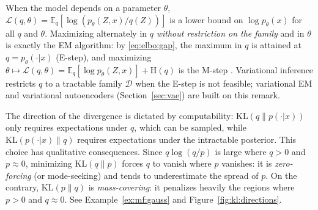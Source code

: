 \documentclass[english,graybox,envcountchap,envcountsame,sectrefs,shortlabels]{svmono}
\theoremstyle{style}
\begin{document}
\begin{remark}
When the model depends on a parameter $\theta$, $\mathcal{L}(q,\theta) = \mathbb{E}_{q}[\log (p_\theta(Z,x)/q(Z))]$ is a lower bound on $\log p_\theta(x)$ for all $q$ and $\theta$. Maximizing alternately in $q$ \emph{without restriction on the family} and in $\theta$ is exactly the EM algorithm: by \eqref{eq:elbo:gap}, the maximum in $q$ is attained at $q = p_{\theta}(\cdot|x)$ (E-step), and maximizing $\theta\mapsto\mathcal{L}(q,\theta) = \mathbb{E}_{q}[\log p_\theta(Z,x)] + \mathrm{H}(q)$ is the M-step \cite{neal1998view}. Variational inference restricts $q$ to a tractable family $\mathcal{D}$ when the E-step is not feasible; variational EM and variational autoencoders (Section~\ref{sec:vae}) are built on this remark.
\end{remark}

The direction of the divergence is dictated by computability: $\mathrm{KL}(q\|p(\cdot|x))$ only requires expectations under $q$, which can be sampled, while $\mathrm{KL}(p(\cdot|x)\|q)$ requires expectations under the intractable posterior. This choice has qualitative consequences. Since $q\log(q/p)$ is large where $q>0$ and $p\approx 0$, minimizing $\mathrm{KL}(q\|p)$ forces $q$ to vanish where $p$ vanishes: it is \emph{zero-forcing} (or mode-seeking) and tends to underestimate the spread of $p$. On the contrary, $\mathrm{KL}(p\|q)$ is \emph{mass-covering}: it penalizes heavily the regions where $p>0$ and $q\approx0$. See Example~\ref{ex:mf:gauss} and Figure~\ref{fig:kl:directions}.
\end{document}
